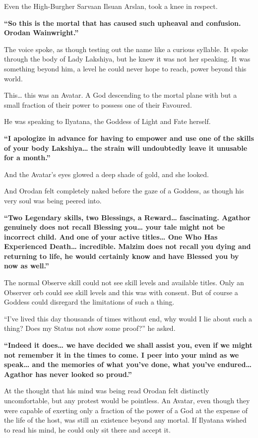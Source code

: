 \documentclass[a4paper,10pt]{book}
\begin{document}
Even the High-Burgher Sarvaan Ilsuan Arslan, took a knee in respect.\par
\textbf{“So this is the mortal that has caused such upheaval and confusion. Orodan Wainwright.”}\par
The voice spoke, as though testing out the name like a curious syllable. It spoke through the body of Lady Lakshiya, but he knew it was not her speaking. It was something beyond him, a level he could never hope to reach, power beyond this world.\par
This… this was an Avatar. A God descending to the mortal plane with but a small fraction of their power to possess one of their Favoured.\par
He was speaking to Ilyatana, the Goddess of Light and Fate herself.\par
\textbf{“I apologize in advance for having to empower and use one of the skills of your body Lakshiya… the strain will undoubtedly leave it unusable for a month.”}\par
And the Avatar’s eyes glowed a deep shade of gold, and she looked.\par
And Orodan felt completely naked before the gaze of a Goddess, as though his very soul was being peered into.\par
\textbf{“Two Legendary skills, two Blessings, a Reward… fascinating. Agathor genuinely does not recall Blessing you… your tale might not be incorrect child. And one of your active titles… One Who Has Experienced Death… incredible. Malzim does not recall you dying and returning to life, he would certainly know and have Blessed you by now as well.”}\par
The normal Observe skill could not see skill levels and available titles. Only an Observer orb could see skill levels and this was with consent. But of course a Goddess could disregard the limitations of such a thing.\par
“I’ve lived this day thousands of times without end, why would I lie about such a thing? Does my Status not show some proof?” he asked.\par
\textbf{“Indeed it does… we have decided we shall assist you, even if we might not remember it in the times to come. I peer into your mind as we speak… and the memories of what you’ve done, what you’ve endured… Agathor has never looked so proud.”}\par
At the thought that his mind was being read Orodan felt distinctly uncomfortable, but any protest would be pointless. An Avatar, even though they were capable of exerting only a fraction of the power of a God at the expense of the life of the host, was still an existence beyond any mortal. If Ilyatana wished to read his mind, he could only sit there and accept it.\par
\end{document}
